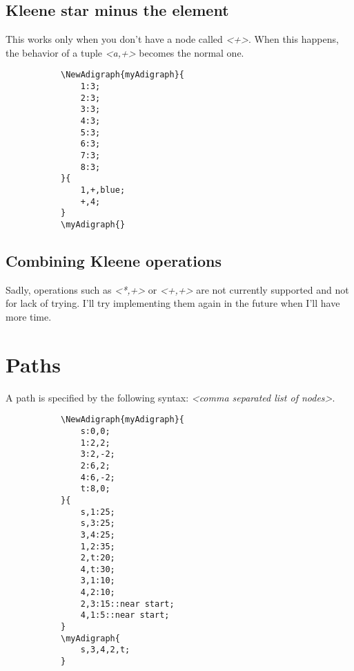 \documentclass{report}
\begin{document}
\subsection{Kleene star minus the element}
This works only when you don't have a node called \textit{<+>}. When this happens, the behavior of a tuple \textit{<a,+>} becomes the normal one.
\begin{figure}
	\begin{subfigure}{0.49\textwidth}
		\begin{verbatim}
\NewAdigraph{myAdigraph}{
	1:3;
	2:3;
	3:3;
	4:3;
	5:3;
	6:3;
	7:3;
	8:3;
}{
	1,+,blue;
	+,4;
}
\myAdigraph{}
\end{verbatim}
	\end{subfigure}
	\begin{subfigure}{0.49\textwidth}
		\myAdigraph{}
	\end{subfigure}
\end{figure}


\subsection{Combining Kleene operations}
Sadly, operations such as \textit{<*,+>} or \textit{<+,+>} are not currently supported and not for lack of trying. I'll try implementing them again in the future when I'll have more time.

\section{Paths}
A path is specified by the following syntax: \textit{<comma separated list of nodes>}.


\begin{figure}
	\begin{subfigure}{0.49\textwidth}
		\begin{verbatim}
\NewAdigraph{myAdigraph}{
	s:0,0;
	1:2,2;
	3:2,-2;
	2:6,2;
	4:6,-2;
	t:8,0;
}{
	s,1:25;
	s,3:25;
	3,4:25;
	1,2:35;
	2,t:20;
	4,t:30;
	3,1:10;
	4,2:10;
	2,3:15::near start;
	4,1:5::near start;
}
\myAdigraph{
	s,3,4,2,t;
}
\end{verbatim}
	\end{subfigure}
	\begin{subfigure}{0.49\textwidth}
	\end{subfigure}
\end{figure}
\end{document}
